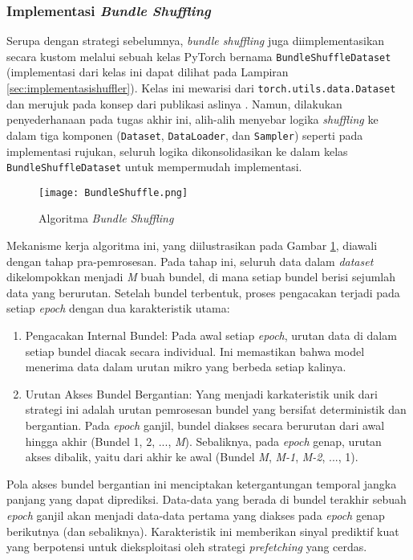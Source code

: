 \subsubsection{Implementasi \textit{Bundle Shuffling}}
Serupa dengan strategi sebelumnya, \textit{bundle shuffling} juga diimplementasikan secara kustom melalui sebuah kelas PyTorch bernama \texttt{BundleShuffleDataset} (implementasi dari kelas ini dapat dilihat pada Lampiran \ref{sec:implementasishuffler}). Kelas ini mewarisi dari \texttt{torch.utils.data.Dataset} dan merujuk pada konsep dari publikasi aslinya \parencite{BundleShuffle}. Namun, dilakukan penyederhanaan pada tugas akhir ini, alih-alih menyebar logika \textit{shuffling} ke dalam tiga komponen (\texttt{Dataset}, \texttt{DataLoader}, dan \texttt{Sampler}) seperti pada implementasi rujukan, seluruh logika dikonsolidasikan ke dalam kelas \texttt{BundleShuffleDataset} untuk mempermudah implementasi.

\begin{figure}[t]
    \centering
    \texttt{[image: BundleShuffle.png]}
    \caption{Algoritma \textit{Bundle Shuffling}}
    \parencite{BundleShuffle}
    \label{fig:BundleShuffling}
\end{figure}

Mekanisme kerja algoritma ini, yang diilustrasikan pada Gambar \ref{fig:BundleShuffling}, diawali dengan tahap pra-pemrosesan. Pada tahap ini, seluruh data dalam \textit{dataset} dikelompokkan menjadi \textit{M} buah bundel, di mana setiap bundel berisi sejumlah data yang berurutan. Setelah bundel terbentuk, proses pengacakan terjadi pada setiap \textit{epoch} dengan dua karakteristik utama:
\begin{enumerate}
    \item Pengacakan Internal Bundel: Pada awal setiap \textit{epoch}, urutan data di dalam setiap bundel diacak secara individual. Ini memastikan bahwa model menerima data dalam urutan mikro yang berbeda setiap kalinya.
    \item Urutan Akses Bundel Bergantian: Yang menjadi karkateristik unik dari strategi ini adalah urutan pemrosesan bundel yang bersifat deterministik dan bergantian. Pada \textit{epoch} ganjil, bundel diakses secara berurutan dari awal hingga akhir (Bundel 1, 2, ..., \textit{M}). Sebaliknya, pada \textit{epoch} genap, urutan akses dibalik, yaitu dari akhir ke awal (Bundel \textit{M}, \textit{M-1}, \textit{M-2}, ..., 1).
\end{enumerate}

Pola akses bundel bergantian ini menciptakan ketergantungan temporal jangka panjang yang dapat diprediksi. Data-data yang berada di bundel terakhir sebuah \textit{epoch} ganjil akan menjadi data-data pertama yang diakses pada \textit{epoch} genap berikutnya (dan sebaliknya). Karakteristik ini memberikan sinyal prediktif kuat yang berpotensi untuk dieksploitasi oleh strategi \textit{prefetching} yang cerdas.


